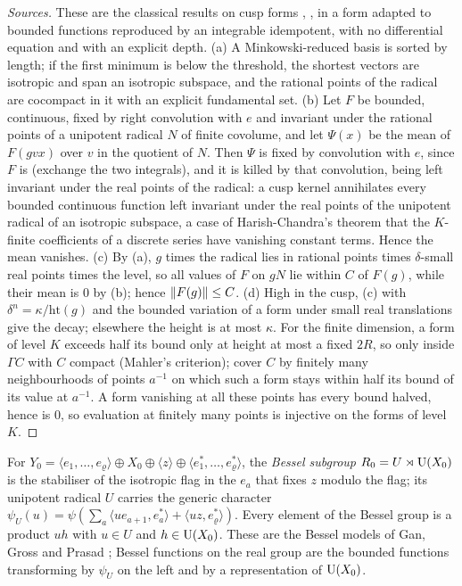 \begin{proof}[Sources]
These are the classical results on cusp forms \cite[\S\S7--8]{Borel2007}, \cite{MillerSchmid2012}, in a form adapted to bounded functions reproduced by an integrable idempotent, with no differential equation and
with an explicit depth. (a) A Minkowski-reduced basis is sorted by length; if the first minimum is below the threshold, the shortest vectors are isotropic and span an isotropic subspace, and the rational points of the
radical are cocompact in it with an explicit fundamental set. (b) Let $F$ be bounded, continuous, fixed by right convolution with $e$ and invariant under the rational points of a unipotent radical $N$ of finite covolume, and let $\Psi(x)$ be the mean of $F(gvx)$
over $v$ in the quotient of $N$. Then $\Psi$ is fixed by convolution with $e$, since $F$ is (exchange the two integrals), and it is killed by that convolution, being left invariant under the real points of
the radical: a cusp kernel annihilates every bounded continuous function left invariant under the real points of the unipotent radical of an isotropic subspace, a case of Harish-Chandra's
theorem that the $K$-finite coefficients of a discrete series have vanishing constant terms. Hence the mean vanishes. (c) By (a), $g$ times the radical lies in rational points times $\delta$-small real points times the level, so all
values of $F$ on $gN$ lie within $C$ of $F(g)$, while their mean is $0$ by (b); hence $\lVert F(g)\rVert\le C$. (d) High in the cusp, (c) with $\delta^n=\kappa/\mathrm{ht}(g)$ and the bounded
variation of a form under small real translations give the decay; elsewhere the height is at most $\kappa$. For the finite dimension, a form of level $K$ exceeds half its bound only at height at most a fixed
$2R$, so only inside $\Gamma C$ with $C$ compact (Mahler's criterion); cover $C$ by finitely many neighbourhoods of points $a^{-1}$ on which such a form stays within half its bound of its value at $a^{-1}$. A form
vanishing at all these points has every bound halved, hence is $0$, so evaluation at finitely many points is injective on the forms of level $K$.
\end{proof}

For $Y_0=\langle e_1,\dots,e_\varrho\rangle\oplus X_0\oplus\langle z\rangle\oplus\langle e^*_1,\dots,e^*_\varrho\rangle$, the \emph{Bessel
subgroup} $R_0=U\rtimes\operatorname{U}(X_0)$ is the stabiliser of the isotropic flag in the $e_a$ that fixes $z$ modulo the flag; its unipotent
radical $U$ carries the generic character $\psi_U(u)=\psi(\sum_a\langle ue_{a+1},e^*_a\rangle+\langle uz,e^*_\varrho\rangle)$. Every
element of the Bessel group is a product $uh$ with $u\in U$ and $h\in\operatorname{U}(X_0)$. These are the Bessel models of Gan, Gross and Prasad
\cite{GGP2012}; Bessel functions on the real group are the bounded functions transforming by $\psi_U$ on the left and by a
representation of $\operatorname{U}(X_0)$.

